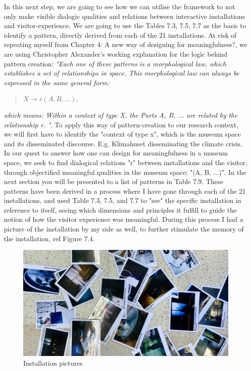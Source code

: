 In this next step, we are going to see how we can utilise the framework to not only make visible dialogic qualities and relations between interactive installations and visitor-experience. We are going to use the Tables 7.3, 7.5, 7.7 as the basis to identify a pattern, directly derived from each of the 21 installations. At risk of repeating myself from Chapter 4: A new way of designing for meaningfulness?, we are using Christopher Alexander's working explanation for the logic behind pattern creation: \emph{"Each one of these patterns is a morphological law, which establishes a set of relationships in space. This morphological law can always be expressed in the same general form:}

\begin{quote}
\centering $X \rightarrow r (A, B, ...)$,
\end{quote}

\emph{
which means: Within a context of type X, the Parts A, B, ... are related by the relationship r. "}\autocite[p. 90]{Alexander_book}. To apply this way of pattern-creation to our research context, we will first have to identify the "context of type x", which is the museum space and its disseminated discourse. E.g. Klimahuset disseminating the climate crisis. In our quest to answer how one can design for meaningfulness in a museum space, we seek to find dialogical relations "r" between installations and the visitor, through objectified meaningful qualities in the museum space; "(A, B, ...)". In the next section you will be presented to a list of patterns in Table 7.9. These patterns have been derived in a process where I have gone through each of the 21 installations, and used Table 7.3, 7.5, and 7.7 to "see" the specific installation in reference to itself, seeing which dimensions and principles it fulfill to guide the notion of how the visitor experience was meaningful. During this process I had a picture of the installation by my side as well, to further stimulate the memory of the installation, ref Figure 7.4. 

\begin{figure}[H]
    \centering
    \includegraphics[width=12cm]{pictures/analysis/pictures.jpeg}
    \caption{Installation pictures}
\end{figure}

